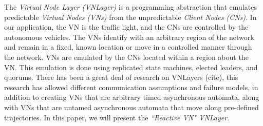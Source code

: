 \documentclass[12pt]{article}
\begin{document}
The {\em Virtual Node Layer (VNLayer)} is a programming abstraction that emulates predictable {\em Virtual Nodes (VNs)} from the unpredictable {\em Client Nodes (CNs)}. In our application, the VN is the traffic light, and the CNs are controlled by the autonomous vehicles.  The VNs identify with an arbitrary region of the network and remain in a fixed, known location  or move in a controlled manner through the network.  VNs are emulated by the CNs located within a region about the VN.  This emulation is done using replicated state machines, elected leaders, and quorums.  
There has been a great deal of research on VNLayers  (cite), this research has allowed different communication assumptions and failure models, in addition to creating VNs that are arbitrary timed asynchronous automata, along with VNs that are untamed asynchronous automata that move along pre-defined trajectories. In this paper, we will present the {\em ``Reactive VN" VNLayer}.\cite{vnlayer}
\end{document}
